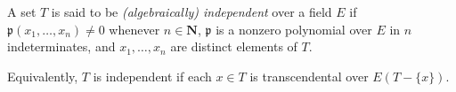 A set $T$ is said to be \emph{(algebraically) independent} over a field $E$ if $\mathfrak{p}(x_1, \dots, x_n) \neq 0$ whenever $n \in \mathbf{N}$, $\mathfrak{p}$ is a nonzero polynomial over $E$ in $n$ indeterminates, and $x_1, \dots, x_n$ are distinct elements of $T$.

Equivalently, $T$ is independent if each $x \in T$ is transcendental over $E(T - \{x\})$.